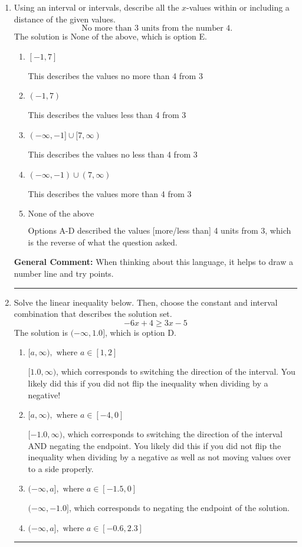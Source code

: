 \documentclass{extbook}[14pt]
\newcommand{\litem}[1]{\item #1

\rule{\textwidth}{0.4pt}}
\begin{document}
\begin{enumerate}\litem{
Using an interval or intervals, describe all the $x$-values within or including a distance of the given values.
\[ \text{ No more than } 3 \text{ units from the number } 4. \]The solution is \( \text{None of the above} \), which is option E.\begin{enumerate}[label=\Alph*.]
\item \( [-1, 7] \)

This describes the values no more than 4 from 3
\item \( (-1, 7) \)

This describes the values less than 4 from 3
\item \( (-\infty, -1] \cup [7, \infty) \)

This describes the values no less than 4 from 3
\item \( (-\infty, -1) \cup (7, \infty) \)

This describes the values more than 4 from 3
\item \( \text{None of the above} \)

Options A-D described the values [more/less than] 4 units from 3, which is the reverse of what the question asked.
\end{enumerate}

\textbf{General Comment:} When thinking about this language, it helps to draw a number line and try points.
}
\litem{
Solve the linear inequality below. Then, choose the constant and interval combination that describes the solution set.
\[ -6x + 4 \geq 3x -5 \]The solution is \( (-\infty, 1.0] \), which is option D.\begin{enumerate}[label=\Alph*.]
\item \( [a, \infty), \text{ where } a \in [1, 2] \)

 $[1.0, \infty)$, which corresponds to switching the direction of the interval. You likely did this if you did not flip the inequality when dividing by a negative!
\item \( [a, \infty), \text{ where } a \in [-4, 0] \)

 $[-1.0, \infty)$, which corresponds to switching the direction of the interval AND negating the endpoint. You likely did this if you did not flip the inequality when dividing by a negative as well as not moving values over to a side properly.
\item \( (-\infty, a], \text{ where } a \in [-1.5, 0] \)

 $(-\infty, -1.0]$, which corresponds to negating the endpoint of the solution.
\item \( (-\infty, a], \text{ where } a \in [-0.6, 2.3] \)


\end{enumerate}}
\end{enumerate}
\end{document}
